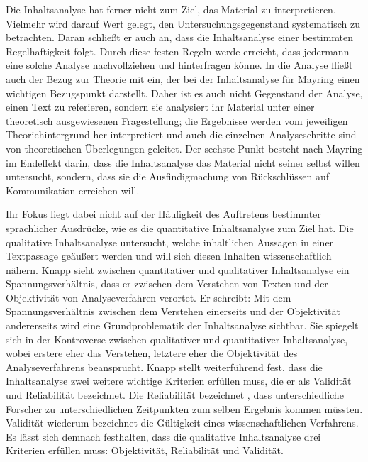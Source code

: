 Die Inhaltsanalyse hat ferner nicht zum Ziel, das Material zu interpretieren. 
Vielmehr wird darauf Wert gelegt, den Untersuchungsgegenstand systematisch zu betrachten. 
Daran schließt er auch an, dass die Inhaltsanalyse einer bestimmten Regelhaftigkeit folgt. 
Durch diese festen Regeln werde erreicht, dass jedermann eine solche Analyse nachvollziehen und hinterfragen könne. 
In die Analyse fließt auch der Bezug zur Theorie mit ein, der bei der Inhaltsanalyse für Mayring einen wichtigen Bezugspunkt darstellt. 
Daher ist es auch nicht Gegenstand der Analyse, einen Text zu referieren, sondern sie \glqq analysiert ihr Material unter einer theoretisch ausgewiesenen Fragestellung; die Ergebnisse werden vom jeweiligen Theoriehintergrund her interpretiert und auch die einzelnen Analyseschritte sind von theoretischen Überlegungen geleitet.\grqq{}\cite[S.\,12]{PM07}
 Der sechste Punkt besteht nach Mayring im Endeffekt darin, dass die Inhaltsanalyse das Material nicht seiner selbst willen untersucht, sondern, dass sie die Ausfindigmachung von Rückschlüssen auf Kommunikation erreichen will. 
 
Ihr Fokus liegt dabei nicht auf der Häufigkeit des Auftretens bestimmter sprachlicher Ausdrücke, wie es die quantitative Inhaltsanalyse zum Ziel hat. 
Die qualitative Inhaltsanalyse untersucht, welche inhaltlichen Aussagen in einer Textpassage geäußert werden und will sich diesen Inhalten wissenschaftlich nähern. 
Knapp sieht zwischen quantitativer und qualitativer Inhaltsanalyse ein Spannungsverhältnis, dass er zwischen dem Verstehen von Texten und der Objektivität von Analyseverfahren verortet. 
Er schreibt: \glqq Mit dem Spannungsverhältnis zwischen dem Verstehen einerseits und der Objektivität andererseits wird eine Grundproblematik der Inhaltsanalyse sichtbar. 
Sie spiegelt sich in der Kontroverse zwischen qualitativer und quantitativer Inhaltsanalyse, wobei erstere eher das Verstehen, letztere eher die Objektivität des Analyseverfahrens beansprucht.\grqq{}\cite[S.\,20f]{WK07}
Knapp stellt weiterführend fest, dass die Inhaltsanalyse zwei weitere wichtige Kriterien erfüllen muss, die er als Validität und Reliabilität bezeichnet. 
Die Reliabilität bezeichnet , dass unterschiedliche Forscher zu unterschiedlichen Zeitpunkten zum selben Ergebnis kommen müssten. 
Validität wiederum bezeichnet die Gültigkeit eines wissenschaftlichen Verfahrens. 
Es lässt sich demnach festhalten, dass die qualitative Inhaltsanalyse drei Kriterien erfüllen muss: Objektivität, Reliabilität und Validität.

